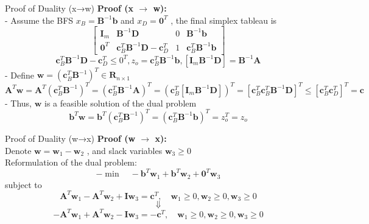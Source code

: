 \documentclass[aspectratio=169,hyperref,UTF8,CJK]{beamer}
\begin{document}
\begin{frame}{Proof of Duality (x→w)}
\textbf{Proof (x \(\rightarrow\) w):} \\
- Assume the BFS \(x_B = \mathbf{B}^{-1}\mathbf{b}\) and \(x_D = \mathbf{0}^T\) , the final simplex tableau is
\[
\left[ \begin{array}{cccc}\mathbf{I}_m & \mathbf{B}^{-1}\mathbf{D} & 0 & \mathbf{B}^{-1}\mathbf{b} \\ \mathbf{0}^T & \mathbf{c}_B^T\mathbf{B}^{-1}\mathbf{D} -\mathbf{c}_D^T & 1 & \mathbf{c}_B^T\mathbf{B}^{-1}\mathbf{b} \end{array} \right]
\]
\[
\mathbf{c}_B^T\mathbf{B}^{-1}\mathbf{D} - \mathbf{c}_D^T\leq 0^T,z_o = \mathbf{c}_B^T\mathbf{B}^{-1}\mathbf{b},\left[\mathbf{I}_m\mathbf{B}^{-1}\mathbf{D}\right] = \mathbf{B}^{-1}\mathbf{A}
\]
- Define \(\mathbf{w} = \left(\mathbf{c}_B^T\mathbf{B}^{-1}\right)^T \in \mathbf{R}_{n \times 1}\)
\[
\mathbf{A}^T\mathbf{w} = \mathbf{A}^T \left(\mathbf{c}_B^T\mathbf{B}^{-1}\right)^T = \left(\mathbf{c}_B^T\mathbf{B}^{-1}\mathbf{A}\right)^T = \left(\mathbf{c}_B^T \left[\mathbf{I}_m \mathbf{B}^{-1}\mathbf{D}\right]\right)^T = \left[\mathbf{c}_B^T \mathbf{c}_B^T\mathbf{B}^{-1}\mathbf{D}\right]^T \leq \left[\mathbf{c}_B^T \mathbf{c}_D^T\right]^T = \mathbf{c}
\]
- Thus, \(\mathbf{w}\) is a feasible solution of the dual problem
\[
\mathbf{b}^T\mathbf{w} = \mathbf{b}^T \left(\mathbf{c}_B^T\mathbf{B}^{-1}\right)^T = \left(\mathbf{c}_B^T\mathbf{B}^{-1}\mathbf{b}\right)^T = z_o^T = z_o
\]
\end{frame}

\begin{frame}{Proof of Duality (w→x)}
\textbf{Proof (w \(\rightarrow\) x):} \\
Denote \(\mathbf{w} = \mathbf{w}_{1} - \mathbf{w}_{2}\) , and slack variables \(\mathbf{w}_{3} \geq 0\) \\
Reformulation of the dual problem:
\[
-\min \quad -\mathbf{b}^{T}\mathbf{w}_{1} + \mathbf{b}^{T}\mathbf{w}_{2} + \mathbf{0}^{T}\mathbf{w}_{3}
\]
subject to
\[
\mathbf{A}^{T}\mathbf{w}_{1} - \mathbf{A}^{T}\mathbf{w}_{2} + \mathbf{I}\mathbf{w}_{3} = \mathbf{c}^{T}, \quad \mathbf{w}_{1}\geq 0,\mathbf{w}_{2}\geq 0,\mathbf{w}_{3}\geq 0
\]
\[
\Downarrow
\]
\[
-\mathbf{A}^{T}\mathbf{w}_{1} + \mathbf{A}^{T}\mathbf{w}_{2} - \mathbf{I}\mathbf{w}_{3} = -\mathbf{c}^{T}, \quad \mathbf{w}_{1}\geq 0,\mathbf{w}_{2}\geq 0,\mathbf{w}_{3}\geq 0
\]
\end{frame}
\end{document}
